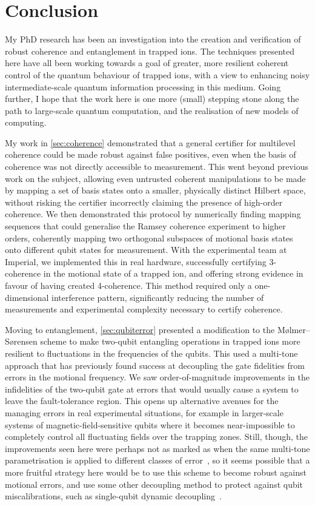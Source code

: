\chapter{Conclusion}


My PhD research has been an investigation into the creation and verification of robust coherence and entanglement in trapped ions.
The techniques presented here have all been working towards a goal of greater, more resilient coherent control of the quantum behaviour of trapped ions, with a view to enhancing noisy intermediate-scale quantum information processing in this medium.
Going further, I hope that the work here is one more (small) stepping stone along the path to large-scale quantum computation, and the realisation of new models of computing.

My work in \cref{sec:coherence} demonstrated that a general certifier for multilevel coherence could be made robust against false positives, even when the basis of coherence was not directly accessible to measurement.
This went beyond previous work on the subject, allowing even untrusted coherent manipulations to be made by mapping a set of basis states onto a smaller, physically distinct Hilbert space, without risking the certifier incorrectly claiming the presence of high-order coherence.
We then demonstrated this protocol by numerically finding mapping sequences that could generalise the Ramsey coherence experiment to higher orders, coherently mapping two orthogonal subspaces of motional basis states onto different qubit states for measurement.
With the experimental team at Imperial, we implemented this in real hardware, successfully certifying 3-coherence in the motional state of a trapped ion, and offering strong evidence in favour of having created 4-coherence.
This method required only a one-dimensional interference pattern, significantly reducing the number of measurements and experimental complexity necessary to certify coherence.

Moving to entanglement, \cref{sec:qubiterror} presented a modification to the M\o lmer--S\o rensen scheme to make two-qubit entangling operations in trapped ions more resilient to fluctuations in the frequencies of the qubits.
This used a multi-tone approach that has previously found success at decoupling the gate fidelities from errors in the motional frequency.
We saw order-of-magnitude improvements in the infidelities of the two-qubit gate at errors that would usually cause a system to leave the fault-tolerance region.
This opens up alternative avenues for the managing errors in real experimental situations, for example in larger-scale systems of magnetic-field-sensitive qubits where it becomes near-impossible to completely control all fluctuating fields over the trapping zones.
Still, though, the improvements seen here were perhaps not as marked as when the same multi-tone parametrisation is applied to different classes of error~\cite{Webb2018,Shapira2018}, so it seems possible that a more fruitful strategy here would be to use this scheme to become robust against motional errors, and use some other decoupling method to protect against qubit miscalibrations, such as single-qubit dynamic decoupling~\cite{Manovitz2017}.

